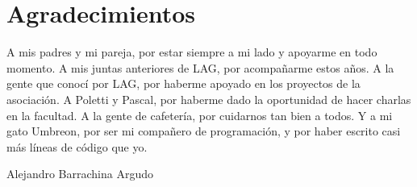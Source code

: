
\chapter*{Agradecimientos}

A mis padres y mi pareja, por estar siempre a mi lado y apoyarme en todo momento. A mis juntas anteriores de LAG, por acompañarme estos años. A la gente que conocí por LAG, por haberme apoyado en los proyectos de la asociación. A Poletti y Pascal, por haberme dado la oportunidad de hacer charlas en la facultad. A la gente de cafetería, por cuidarnos tan bien a todos. Y a mi gato Umbreon, por ser mi compañero de programación, y por haber escrito casi más líneas de código que yo.

\begin{flushright}
    Alejandro Barrachina Argudo
\end{flushright}











